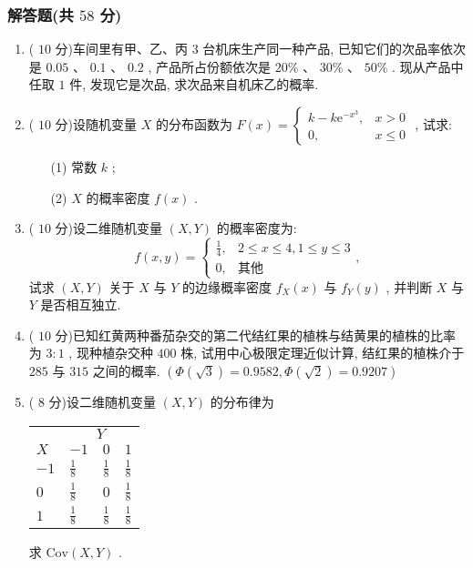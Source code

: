 \documentclass[cn,11pt,fancy,hide]{elegantbook}
\newcommand{\ee}{\mathrm{e}}
\renewcommand{\leq}{\leqslant}
\begin{document}
\subsubsection{解答题(共 $58$ 分)}
\begin{enumerate}
	\item ( $10$ 分)车间里有甲、乙、丙 $3$ 台机床生产同一种产品, 已知它们的次品率依次是 $0.05$ 、 $0.1$ 、 $0.2$ , 产品所占份额依次是 $20\%$ 、 $30\%$ 、 $50\%$ . 现从产品中任取 $1$ 件, 发现它是次品, 求次品来自机床乙的概率.
	
	\item ( $10$ 分)设随机变量 $X$ 的分布函数为 $F(x)=
	\begin{cases}
	k-k\ee^{-x^3}, & x>0\\
	0, & x\leq0
	\end{cases}
	$ , 试求:
	\begin{enumerate}
		\item[(1)] 常数 $k$ ;
		\item[(2)] $X$ 的概率密度 $f(x)$ .
	\end{enumerate}

	\item ( $10$ 分)设二维随机变量 $(X,Y)$ 的概率密度为:
	\begin{equation*}
		f(x,y)=
		\begin{cases}
		\frac{1}{4}, & 2\leq x\leq4,1\leq y\leq3\\
		0, & \text{其他}
		\end{cases},
	\end{equation*}
	试求 $(X,Y)$ 关于 $X$ 与 $Y$ 的边缘概率密度 $f_X(x)$ 与 $f_Y(y)$ , 并判断 $X$ 与 $Y$ 是否相互独立.
	
	\item ( $10$ 分)已知红黄两种番茄杂交的第二代结红果的植株与结黄果的植株的比率为 $3:1$ , 现种植杂交种 $400$ 株, 试用中心极限定理近似计算, 结红果的植株介于 $285$ 与 $315$ 之间的概率. $\left(\varPhi\left(\sqrt{3}\right)=0.9582,\varPhi\left(\sqrt{2}\right)=0.9207\right)$
	
	\item ( $8$ 分)设二维随机变量 $(X,Y)$ 的分布律为
	\begin{center}
		\begin{tabularx}{0.8\textwidth}{ZZZZ}
			\hline
			 & \\
			$X$ & $-1$ & $0$ & $1$\\
			\hline
			$-1$ & $\frac{1}{8}$ & $\frac{1}{8}$ & $\frac{1}{8}$\\
			$0$ & $\frac{1}{8}$ & $0$ & $\frac{1}{8}$\\
			$1$ & $\frac{1}{8}$ & $\frac{1}{8}$ & $\frac{1}{8}$\\
			\hline
		\end{tabularx}
	\end{center}
	求 $\mathrm{Cov}(X,Y)$ .
	

\end{enumerate}
\end{document}
